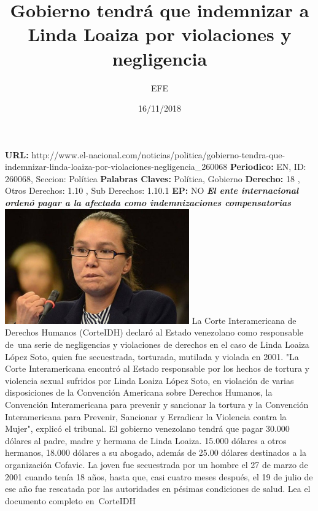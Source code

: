 \documentclass{article}%
\title{\textbf{Gobierno tendrá que indemnizar a Linda Loaiza por violaciones y negligencia}}%
\author{EFE}%
\date{16/11/2018}%
\begin{document}
%
\normalsize%
\maketitle%
\textbf{URL: }%
http://www.el{-}nacional.com/noticias/politica/gobierno{-}tendra{-}que{-}indemnizar{-}linda{-}loaiza{-}por{-}violaciones{-}negligencia\_260068\newline%
%
\textbf{Periodico: }%
EN, %
ID: %
260068, %
Seccion: %
Política\newline%
%
\textbf{Palabras Claves: }%
Política, Gobierno\newline%
%
\textbf{Derecho: }%
18%
, Otros Derechos: %
1.10%
, Sub Derechos: %
1.10.1%
\newline%
%
\textbf{EP: }%
NO\newline%
\newline%
%
\textbf{\textit{El ente internacional ordenó pagar a la afectada como indemnizaciones compensatorias}}%
\newline%
\newline%
%
\includegraphics[width=300px]{265.jpg}%
\newline%
%
La Corte Interamericana de Derechos Humanos (CorteIDH) declaró al Estado venezolano como responsable de~una serie de negligencias y violaciones de derechos en el caso de Linda Loaiza López Soto, quien fue secuestrada, torturada, mutilada y violada en 2001.%
\newline%
%
"La Corte Interamericana encontró al Estado responsable por los hechos de tortura y violencia sexual sufridos por Linda Loaiza López Soto, en violación de varias disposiciones de la Convención Americana sobre Derechos Humanos, la Convención Interamericana para prevenir y sancionar la tortura y la Convención Interamericana para Prevenir, Sancionar y Erradicar la Violencia contra la Mujer", explicó el tribunal.%
\newline%
%
El gobierno venezolano tendrá que pagar 30.000 dólares al padre, madre y hermana de Linda Loaiza. 15.000 dólares a otros hermanos, 18.000 dólares a su abogado, además de 25.00 dólares destinados a la organización Cofavic.%
\newline%
%
La joven fue secuestrada por un hombre el 27 de marzo de 2001 cuando tenía 18 años, hasta que, casi cuatro meses después, el 19 de julio de ese año fue rescatada por las autoridades en pésimas condiciones de salud.%
\newline%
%
Lea el documento completo en~CorteIDH%
\newline%
%
\end{document}
